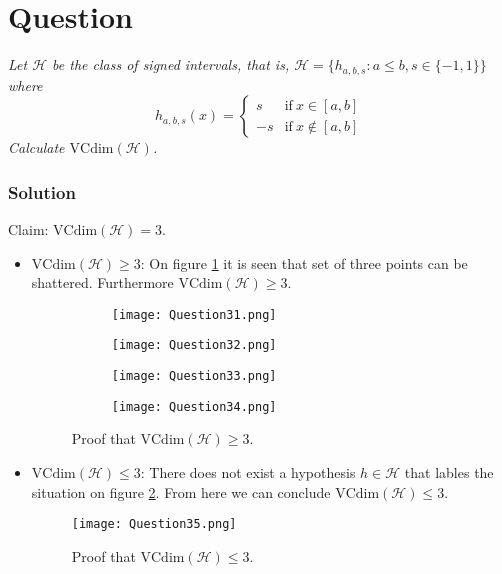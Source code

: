 \documentclass{article}
\newcounter{counterquestion}
\newenvironment{question}[1]
{
\stepcounter{counterquestion}
\section*{Question \thecounterquestion}
\emph{#1} 
} 
{
}
\newenvironment{solution}
{
\subsubsection*{Solution}
} 
{
}
\begin{document}
\begin{question}{Let $\mathcal{H}$ be the class of signed intervals, that is, $\mathcal{H} = \{h_{a, b, s} : a \leq b, s \in \{-1, 1\}\}$ where
\[
h_{a, b, s}(x) =
\begin{cases}
s & \text{if}\ x \in [a, b] \\
-s & \text{if}\ x \notin [a, b] 
\end{cases}
\]
Calculate $\text{VCdim}(\mathcal{H})$.}
\begin{solution}
Claim: $\text{VCdim}(\mathcal{H}) = 3$.

\begin{itemize}
\item $\text{VCdim}(\mathcal{H}) \geq 3$: On figure \ref{fig: question31} it is seen that set of three points can be shattered. Furthermore $\text{VCdim}(\mathcal{H}) \geq 3$.

\begin{figure}[h!]
    \centering
    \begin{subfigure}[t]{0.4\textwidth}
        \centering
        \texttt{[image: Question31.png]}
        \caption{}
    \end{subfigure}
    \begin{subfigure}[t]{0.4\textwidth}
        \centering
        \texttt{[image: Question32.png]}
        \caption{}
    \end{subfigure}
     \begin{subfigure}[t]{0.4\textwidth}
        \centering
        \texttt{[image: Question33.png]}
        \caption{}
    \end{subfigure}
     \begin{subfigure}[t]{0.4\textwidth}
        \centering
        \texttt{[image: Question34.png]}
        \caption{}
    \end{subfigure}
    \caption{Proof that $\text{VCdim}(\mathcal{H}) \geq 3$.}
    \label{fig: question31}
\end{figure}

\item $\text{VCdim}(\mathcal{H}) \leq 3$: There does not exist a hypothesis $h \in \mathcal{H}$ that lables the situation on figure \ref{fig: question32}. From here we can conclude $\text{VCdim}(\mathcal{H}) \leq 3$.

\begin{figure}[h!]
    \centering
        \texttt{[image: Question35.png]}
    \caption{Proof that $\text{VCdim}(\mathcal{H}) \leq 3$.}
    \label{fig: question32}
\end{figure}

\end{itemize}

\end{solution}
\end{question}
\end{document}
